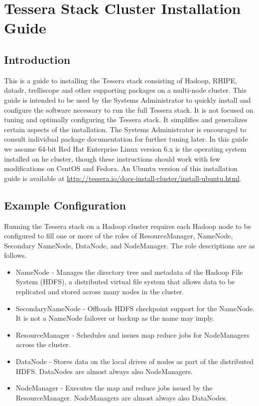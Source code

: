 \section{Tessera Stack Cluster Installation Guide}
\subsection{Introduction}
This is a guide to installing the Tessera stack consisting of
Hadoop\textregistered, RHIPE, datadr, trelliscope and other supporting
packages on a multi-node cluster.  This guide is intended to be used
by the Systems Administrator to quickly install and configure the
software necessary to run the full Tessera stack.  It is not focused
on tuning and optimally configuring the Tessera stack.  It simplifies
and generalizes certain aspects of the installation.  The Systems
Administrator is encouraged to consult individual package
documentation for further tuning later.  In this guide we assume
64-bit Red Hat Enterprise Linux version 6.x is the operating system
installed on he cluster, though these instructions should work with
few modifications on CentOS and Fedora.  An Ubuntu version of this
installation guide is available at
\url{http://tessera.io/docs-install-cluster/install-ubuntu.html}.

\subsection{Example Configuration}
Running the Tessera stack on a Hadoop cluster requires each Hadoop node
to be configured to fill one or more of the roles of ResourceManager,
NameNode, Secondary NameNode, DataNode, and NodeManager. The role
descriptions are as follows.

\begin{itemize}
\item NameNode - Manages the directory tree and metadata of the Hadoop File System (HDFS), a distributed virtual file system that allows data to be replicated and stored across many nodes in the cluster. 
\item SecondaryNameNode - Offloads HDFS checkpoint support for the NameNode.  It is not a NameNode failover or backup as the name may imply.
\item ResourceManager - Schedules and issues map reduce jobs for NodeManagers across the cluster.
\item DataNode - Stores data on the local drives of nodes as part of the distributed HDFS.  DataNodes are almost always also NodeManagers.
\item NodeManager - Executes the map and reduce jobs issued by the ResourceManager. NodeManagers are almost always also DataNodes.
\end{itemize}

